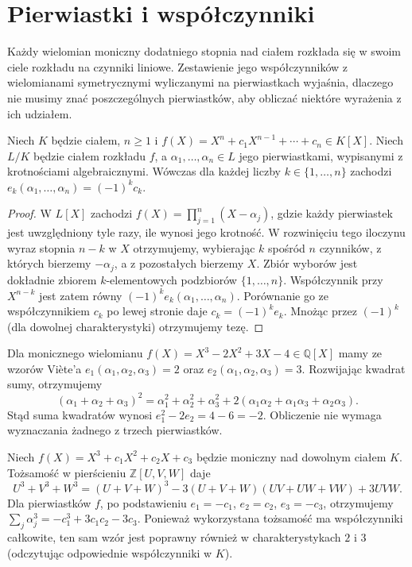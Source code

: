 \section{Pierwiastki i współczynniki}

Każdy wielomian moniczny dodatniego stopnia nad ciałem
rozkłada się w swoim ciele rozkładu na czynniki liniowe.
Zestawienie jego współczynników
z wielomianami symetrycznymi wyliczanymi na pierwiastkach wyjaśnia,
dlaczego nie musimy znać poszczególnych pierwiastków,
aby obliczać niektóre wyrażenia z ich udziałem.

\begin{twierdzenie}\label{aa:tw:vieta-general}
Niech $K$ będzie ciałem, $n\ge1$ i
$f(X)=X^n+c_1X^{n-1}+\cdots+c_n\in K[X]$.
Niech $L/K$ będzie ciałem rozkładu $f$, a
$\alpha_1,\ldots,\alpha_n\in L$ jego pierwiastkami,
wypisanymi z krotnościami algebraicznymi.
Wówczas dla każdej liczby $k\in\{1,\ldots,n\}$ zachodzi
$e_k(\alpha_1,\ldots,\alpha_n)=(-1)^kc_k$.
\end{twierdzenie}
\begin{proof}
W $L[X]$ zachodzi
$f(X)=\prod_{j=1}^n(X-\alpha_j)$, gdzie każdy pierwiastek
jest uwzględniony tyle razy, ile wynosi jego krotność.
W rozwinięciu tego iloczynu wyraz stopnia $n-k$ w $X$
otrzymujemy, wybierając $k$ spośród $n$ czynników,
z których bierzemy $-\alpha_j$, a z pozostałych
bierzemy $X$. Zbiór wyborów jest dokładnie zbiorem
$k$-elementowych podzbiorów $\{1,\ldots,n\}$.
Współczynnik przy $X^{n-k}$ jest zatem równy
$(-1)^ke_k(\alpha_1,\ldots,\alpha_n)$.
Porównanie go ze współczynnikiem $c_k$ po lewej stronie
daje $c_k=(-1)^ke_k$. Mnożąc przez $(-1)^k$
(dla dowolnej charakterystyki) otrzymujemy tezę.
\end{proof}

\begin{przyklad}\label{aa:prz:symmetric-squares}
Dla monicznego wielomianu
$f(X)=X^3-2X^2+3X-4\in\mathbb Q[X]$ mamy ze wzorów
Viète'a $e_1(\alpha_1,\alpha_2,\alpha_3)=2$ oraz
$e_2(\alpha_1,\alpha_2,\alpha_3)=3$.
Rozwijając kwadrat sumy, otrzymujemy
\[
 (\alpha_1+\alpha_2+\alpha_3)^2
 =\alpha_1^2+\alpha_2^2+\alpha_3^2
  +2(\alpha_1\alpha_2+\alpha_1\alpha_3+\alpha_2\alpha_3).
\]
Stąd suma kwadratów wynosi $e_1^2-2e_2=4-6=-2$.
Obliczenie nie wymaga wyznaczania żadnego z trzech pierwiastków.
\end{przyklad}

\begin{przyklad}
Niech $f(X)=X^3+c_1X^2+c_2X+c_3$ będzie moniczny
nad dowolnym ciałem $K$. Tożsamość w pierścieniu
$\mathbb Z[U,V,W]$ daje
\[
 U^3+V^3+W^3=(U+V+W)^3
 -3(U+V+W)(UV+UW+VW)+3UVW.
\]
Dla pierwiastków $f$, po podstawieniu
$e_1=-c_1$, $e_2=c_2$, $e_3=-c_3$, otrzymujemy
$\sum_j\alpha_j^3=-c_1^3+3c_1c_2-3c_3$.
Ponieważ wykorzystana tożsamość ma współczynniki
całkowite, ten sam wzór jest poprawny również
w charakterystykach $2$ i $3$ (odczytując odpowiednie
współczynniki w $K$).
\end{przyklad}

